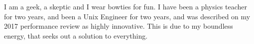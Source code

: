 

\begin{cvparagraph}



I am a geek, a skeptic and I wear bowties for fun.
I have been a physics teacher for two years, and been a Unix Engineer for two years, and was described on my 2017 performance review as highly innovative.
This is due to my boundless energy, that seeks out a solution to everything.
\end{cvparagraph}




